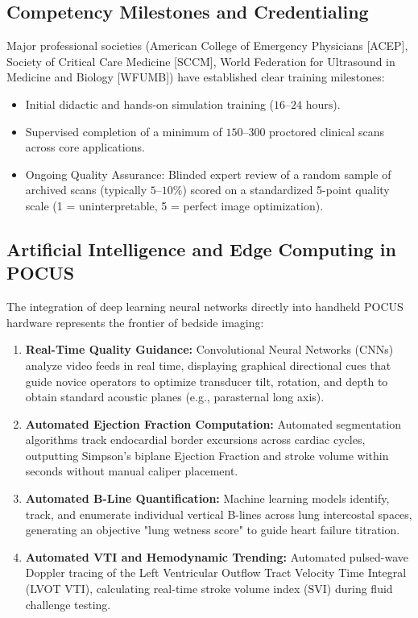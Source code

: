 \documentclass[11pt,a4paper]{article}
\begin{document}
\subsection{Competency Milestones and Credentialing}
Major professional societies (American College of Emergency Physicians [ACEP], Society of Critical Care Medicine [SCCM], World Federation for Ultrasound in Medicine and Biology [WFUMB]) have established clear training milestones:
\begin{itemize}[leftmargin=2em]
    \item Initial didactic and hands-on simulation training ($16\text{--}24\text{ hours}$).
    \item Supervised completion of a minimum of $150\text{--}300$ proctored clinical scans across core applications.
    \item Ongoing Quality Assurance: Blinded expert review of a random sample of archived scans (typically $5\text{--}10\%$) scored on a standardized 5-point quality scale (1 = uninterpretable, 5 = perfect image optimization).
\end{itemize}

\subsection{Artificial Intelligence and Edge Computing in POCUS}
The integration of deep learning neural networks directly into handheld POCUS hardware represents the frontier of bedside imaging:
\begin{enumerate}[leftmargin=2em]
    \item \textbf{Real-Time Quality Guidance:} Convolutional Neural Networks (CNNs) analyze video feeds in real time, displaying graphical directional cues that guide novice operators to optimize transducer tilt, rotation, and depth to obtain standard acoustic planes (e.g., parasternal long axis).
    \item \textbf{Automated Ejection Fraction Computation:} Automated segmentation algorithms track endocardial border excursions across cardiac cycles, outputting Simpson's biplane Ejection Fraction and stroke volume within seconds without manual caliper placement.
    \item \textbf{Automated B-Line Quantification:} Machine learning models identify, track, and enumerate individual vertical B-lines across lung intercostal spaces, generating an objective "lung wetness score" to guide heart failure titration.
    \item \textbf{Automated VTI and Hemodynamic Trending:} Automated pulsed-wave Doppler tracing of the Left Ventricular Outflow Tract Velocity Time Integral (LVOT VTI), calculating real-time stroke volume index ($\text{SVI}$) during fluid challenge testing.
\end{enumerate}
\end{document}
